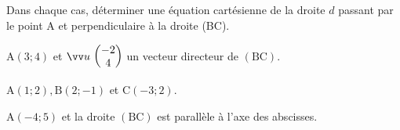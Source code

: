 \documentclass[12pt,a4paper]{article}  %
\begin{document}

Dans chaque cas, déterminer une équation cartésienne de la droite $d$ passant par le point $\mathrm{A}$ et perpendiculaire à la droite (BC).
\begin{enumMet}
    \item {} $\mathrm{A}(3 ; 4)$ et $\Coord{u}{-2}{4}$ un vecteur directeur de $(\mathrm{BC})$.
    \item $\mathrm{A}(1 ; 2), \mathrm{B}(2 ;-1)$ et $\mathrm{C}(-3 ; 2)$.
    \item $\mathrm{A}(-4 ; 5)$ et la droite $(\mathrm{BC})$ est parallèle à l'axe des abscisses.
\end{enumMet}
\end{document}
